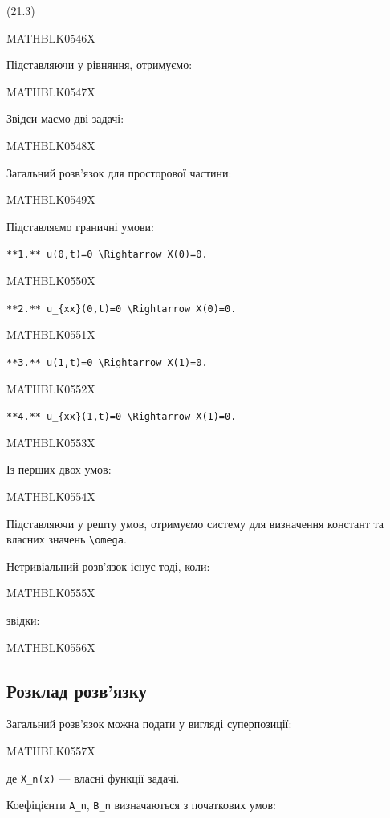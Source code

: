 \documentclass[
  ukrainian,
]{article}
\begin{document}
(21.3)

MATHBLK0546X

Підставляючи у рівняння, отримуємо:

MATHBLK0547X

Звідси маємо дві задачі:

MATHBLK0548X

Загальний розв'язок для просторової частини:

MATHBLK0549X

Підставляємо граничні умови:

\texttt{**1.**\ \textquotesingle{}u(0,t)=0\ \textbackslash{}Rightarrow\ X(0)=0\textquotesingle{}.}

MATHBLK0550X

\texttt{**2.**\ \textquotesingle{}u\_\{xx\}(0,t)=0\ \textbackslash{}Rightarrow\ X\textquotesingle{}\textquotesingle{}(0)=0\textquotesingle{}.}

MATHBLK0551X

\texttt{**3.**\ \textquotesingle{}u(1,t)=0\ \textbackslash{}Rightarrow\ X(1)=0\textquotesingle{}.}

MATHBLK0552X

\texttt{**4.**\ \textquotesingle{}u\_\{xx\}(1,t)=0\ \textbackslash{}Rightarrow\ X\textquotesingle{}\textquotesingle{}(1)=0\textquotesingle{}.}

MATHBLK0553X

Із перших двох умов:

MATHBLK0554X

Підставляючи у решту умов, отримуємо систему для визначення констант та
власних значень \texttt{\textbackslash{}omega}.

Нетривіальний розв'язок існує тоді, коли:

MATHBLK0555X

звідки:

MATHBLK0556X

\subsection{Розклад
розв'язку}\label{ux440ux43eux437ux43aux43bux430ux434-ux440ux43eux437ux432ux44fux437ux43aux443}

Загальний розв'язок можна подати у вигляді суперпозиції:

MATHBLK0557X

де \texttt{X\_n(x)} --- власні функції задачі.

Коефіцієнти \texttt{A\_n}, \texttt{B\_n} визначаються з початкових умов:
\end{document}
